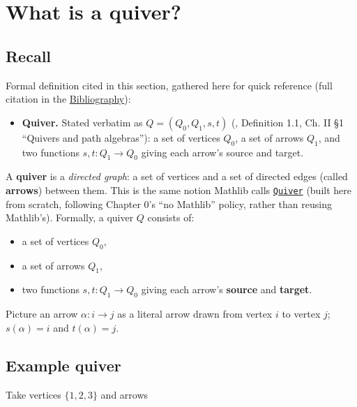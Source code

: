 \section{What is a quiver?}\label{sec:11-path-algebras:01-what-is-a-quiver:1}

\subsection{Recall}\label{sec:11-path-algebras:01-what-is-a-quiver:0b}

Formal definition cited in this section, gathered here for quick reference (full citation in the \hyperref[sec:root:bibliography:1]{Bibliography}):

\begin{itemize}
\tightlist
\item
  \textbf{Quiver.} Stated verbatim as \(Q = (Q_0, Q_1, s, t)\) (\cite{AssemSimsonSkowronski2006}, Definition 1.1, Ch. II §1 ``Quivers and path algebras''): a set of vertices \(Q_0\), a set of arrows \(Q_1\), and two functions \(s, t : Q_1 \to Q_0\) giving each arrow's source and target.
\end{itemize}

A \textbf{quiver} is a \emph{directed graph}: a set of vertices and a set of directed edges (called \textbf{arrows}) between them. This is the same notion Mathlib calls \href{https://loogle.lean-lang.org/?q=Quiver}{\texttt{Quiver}} (built here from scratch, following Chapter 0's ``no Mathlib'' policy, rather than reusing Mathlib's). Formally, a quiver \(Q\) consists of:

\begin{itemize}
\tightlist
\item
  a set of vertices \(Q_0\),
\item
  a set of arrows \(Q_1\),
\item
  two functions \(s, t : Q_1 \to Q_0\) giving each arrow's \textbf{source} and \textbf{target}.
\end{itemize}

Picture an arrow \(\alpha : i \to j\) as a literal arrow drawn from vertex \(i\) to vertex \(j\); \(s(\alpha) = i\) and \(t(\alpha) = j\).

\subsection{Example quiver}\label{sec:11-path-algebras:01-what-is-a-quiver:2}

Take vertices \(\{1, 2, 3\}\) and arrows

